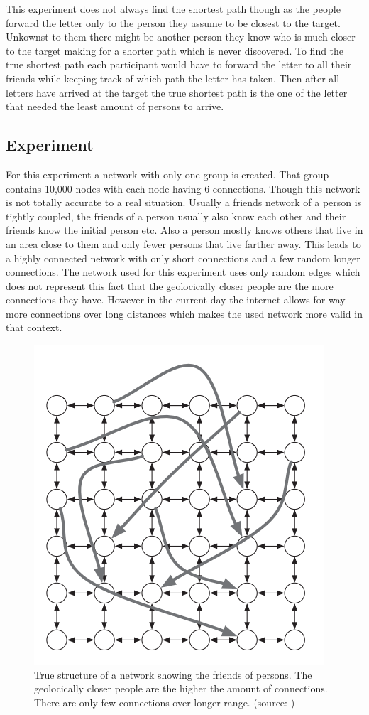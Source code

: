 This experiment does not always find the shortest path though as the people forward the letter
only to the person they assume to be closest to the target. Unkownst to them there might
be another person they know who is much closer to the target making for a shorter path which
is never discovered. To find the true shortest path each participant would have to forward
the letter to all their friends while keeping track of which path the letter has taken.
Then after all letters have arrived at the target the true shortest path is the one of the
letter that needed the least amount of persons to arrive.

\subsection{Experiment}
For this experiment a network with only one group is created. That group
contains 10,000 nodes with each node having 6
connections. Though this network is not totally accurate to a real situation. Usually 
a friends network of a person is tightly coupled, the friends of a person usually also know
each other and their friends know the initial person etc. Also a person mostly knows
others that live in an area close to them and only fewer persons that live farther away.
This leads to a highly connected network with only short connections and a few random longer connections.
The network used for this experiment uses only random edges which does not represent this
fact that the geolocically closer people are the more connections they have. However in the
current day the internet allows for way more connections over long distances which makes
the used network more valid in that context.

\begin{figure}
    \centering
    \includegraphics[width=0.5\linewidth]{images/sw_true_network.png}
    \caption{True structure of a network showing the friends of persons. The
    geolocically closer people are the higher the amount of connections. There
    are only few connections over longer range. (source: \cite{networks})}
    \label{fig:oscillation}
\end{figure}


